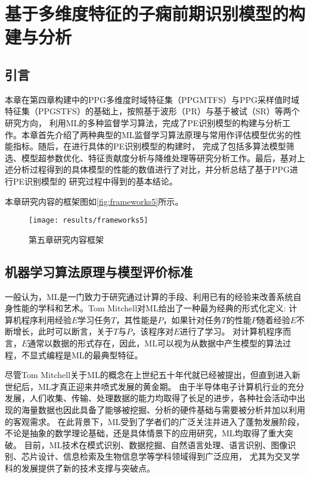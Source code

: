 \chapter{基于多维度特征的子痫前期识别模型的构建与分析}
\section{引言}
本章在第四章构建中的PPG多维度时域特征集（PPGMTFS）与PPG采样值时域特征集（PPGSTFS）的基础上，按照基于波形（PR）与基于被试（SR）等两个研究方向，
利用ML的多种监督学习算法，完成了PE识别模型的构建与分析工作。本章首先介绍了两种典型的ML监督学习算法原理与常用作评估模型优劣的性能指标。随后，在进行具体的PE识别模型的构建时，
完成了包括多算法模型筛选、模型超参数优化、特征贡献度分析与降维处理等研究分析工作。最后，基对上述分析过程得到的具体模型的性能的数值进行了对比，并分析总结了基于PPG进行PE识别模型的
研究过程中得到的基本结论。

本章研究内容的框架图如\autoref{fig:frameworks5}所示。

\begin{figure}[htbp]
      \centering
      \texttt{[image: results/frameworks5]}
      \caption{\label{fig:frameworks5}第五章研究内容框架}
\end{figure}
\vspace{-0.8cm} 

\section{机器学习算法原理与模型评价标准}
一般认为，ML是一门致力于研究通过计算的手段、利用已有的经验来改善系统自身性能的学科和艺术\cite{Zhou2016,Aurélien2018}。Tom Mitchell对ML给出了一种最为经典的形式化定义:
计算机程序利用经验$E$学习任务$T$，其性能是$P$，如果针对任务$T$的性能$P$随着经验$E$不断增长，此时可以断言，关于$T$与$P$，该程序对$E$进行了学习\cite{mitchell1997,Zhou2016}。
对计算机程序而言，$E$通常以数据的形式存在，因此，ML可以视为从数据中产生模型的算法过程，不显式编程是ML的最典型特征。

尽管Tom Mitchell关于ML的概念在上世纪五十年代就已经被提出，但直到进入新世纪后，ML才真正迎来井喷式发展的黄金期。
由于半导体电子计算机行业的充分发展，人们收集、传输、处理数据的能力均取得了长足的进步，各种社会活动中出现的海量数据也因此具备了能够被挖掘、分析的硬件基础与需要被分析并加以利用的客观需求。
在此背景下，ML受到了学者们的广泛关注并进入了蓬勃发展阶段，不论是抽象的数学理论基础，还是具体情景下的应用研究，ML均取得了重大突破。
目前，ML技术在模式识别、数据挖掘、自然语言处理、语言识别、图像识别、芯片设计、信息检索及生物信息学等学科领域得到广泛应用，
尤其为交叉学科的发展提供了新的技术支撑与突破点\cite{Zhou2016,Aurélien2018,Li2017}。   

